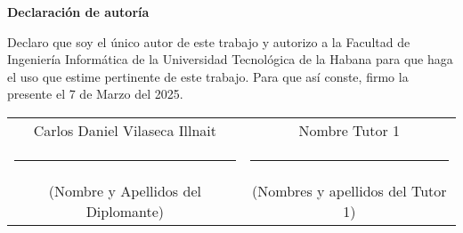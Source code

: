 {\Large \textbf{Declaración de autoría} \vspace{.3cm}}

Declaro que soy el único autor de este trabajo y autorizo a la Facultad de Ingeniería Informática de la Universidad Tecnológica de la Habana para que haga el uso que estime pertinente de este trabajo. Para que así conste, firmo la presente el 7 de Marzo del 2025.

\vspace{3cm}

\begingroup	

\setlength{\tabcolsep}{10pt} %
\renewcommand{\arraystretch}{0.5} %
\centering
\begin{tabular}{c c}
	
	Carlos Daniel Vilaseca Illnait  & Nombre Tutor 1 \\
	\noindent\rule{6cm}{0.4pt} & \noindent\rule{6cm}{0.4pt} \\
	(Nombre y Apellidos del Diplomante) &  	(Nombres y apellidos del Tutor 1)	
\end{tabular}
\vspace{3cm}

\endgroup

